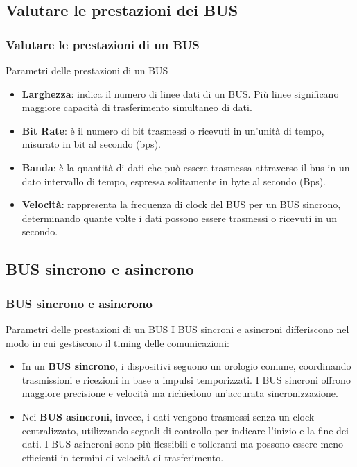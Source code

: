 \subsection[Valutare le prestazioni dei BUS]{Valutare le prestazioni dei BUS}
\begin{frame}
	\frametitle{Valutare le prestazioni di un BUS}
	  
	\begin{block}{Parametri delle prestazioni di un BUS}
		\begin{itemize}
			\item \textbf{Larghezza}: indica il numero di linee dati di un BUS. Più linee significano maggiore capacità di trasferimento simultaneo di dati.
			\item \textbf{Bit Rate}: è il numero di bit trasmessi o ricevuti in un'unità di tempo, misurato in bit al secondo (bps).
			\item \textbf{Banda}: è la quantità di dati che può essere trasmessa attraverso il bus in un dato intervallo di tempo, espressa solitamente in byte al secondo (Bps).
			\item \textbf{Velocità}: rappresenta la frequenza di clock del BUS per un BUS sincrono, determinando quante volte i dati possono essere trasmessi o ricevuti in un secondo.
		\end{itemize}
		
	\end{block}

\end{frame}


\subsection[BUS sincrono e asincrono]{BUS sincrono e asincrono}
\begin{frame}
	\frametitle{BUS sincrono e asincrono}
	  
	\begin{block}{Parametri delle prestazioni di un BUS}
		I BUS sincroni e asincroni differiscono nel modo in cui gestiscono il timing delle comunicazioni:
		\begin{itemize}
			\item In un \textbf{BUS sincrono}, i dispositivi seguono un orologio comune, coordinando trasmissioni e ricezioni in base a impulsi temporizzati.
				I BUS sincroni offrono maggiore precisione e velocità ma richiedono un'accurata sincronizzazione. 
			\item Nei \textbf{BUS asincroni}, invece, i dati vengono trasmessi senza un clock centralizzato, utilizzando segnali di controllo per indicare l'inizio e la fine dei dati. I BUS asincroni sono più flessibili e tolleranti ma possono essere meno efficienti in termini di velocità di trasferimento.
		\end{itemize}
		
	\end{block}

\end{frame}

